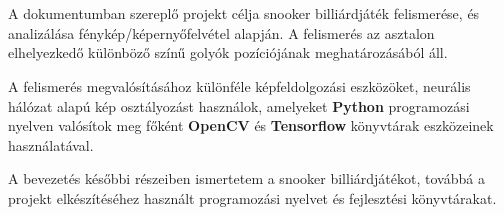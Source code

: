 \chapter{\bevezetes}

A dokumentumban szereplő projekt célja snooker billiárdjáték felismerése, és analizálása fénykép/képernyőfelvétel alapján. A felismerés az asztalon elhelyezkedő különböző színű golyók pozíciójának meghatározásából áll.
\par A felismerés megvalósításához különféle képfeldolgozási eszközöket, neurális hálózat alapú kép osztályozást használok, amelyeket \textbf{Python} programozási nyelven valósítok meg főként \textbf{OpenCV} és \textbf{Tensorflow} könyvtárak eszközeinek használatával.
\par A bevezetés későbbi részeiben ismertetem a snooker billiárdjátékot, továbbá a projekt elkészítéséhez használt programozási nyelvet és fejlesztési könyvtárakat.
